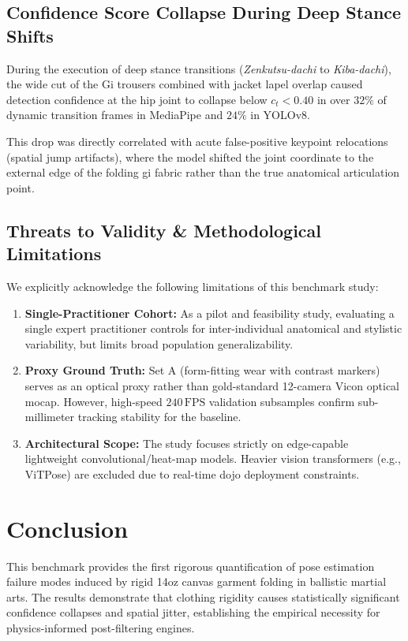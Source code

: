 \subsection{Confidence Score Collapse During Deep Stance Shifts}
During the execution of deep stance transitions (\textit{Zenkutsu-dachi} to \textit{Kiba-dachi}), the wide cut of the Gi trousers combined with jacket lapel overlap caused detection confidence at the hip joint to collapse below $c_t < 0.40$ in over $32\%$ of dynamic transition frames in MediaPipe and $24\%$ in YOLOv8. 

This drop was directly correlated with acute false-positive keypoint relocations (spatial jump artifacts), where the model shifted the joint coordinate to the external edge of the folding gi fabric rather than the true anatomical articulation point.

\subsection{Threats to Validity \& Methodological Limitations}
We explicitly acknowledge the following limitations of this benchmark study:
\begin{enumerate}
    \item \textbf{Single-Practitioner Cohort:} As a pilot and feasibility study, evaluating a single expert practitioner controls for inter-individual anatomical and stylistic variability, but limits broad population generalizability.
    \item \textbf{Proxy Ground Truth:} Set A (form-fitting wear with contrast markers) serves as an optical proxy rather than gold-standard 12-camera Vicon optical mocap. However, high-speed $240\,\text{FPS}$ validation subsamples confirm sub-millimeter tracking stability for the baseline.
    \item \textbf{Architectural Scope:} The study focuses strictly on edge-capable lightweight convolutional/heat-map models. Heavier vision transformers (e.g., ViTPose) are excluded due to real-time dojo deployment constraints.
\end{enumerate}

\section{Conclusion}
This benchmark provides the first rigorous quantification of pose estimation failure modes induced by rigid 14oz canvas garment folding in ballistic martial arts. The results demonstrate that clothing rigidity causes statistically significant confidence collapses and spatial jitter, establishing the empirical necessity for physics-informed post-filtering engines.
